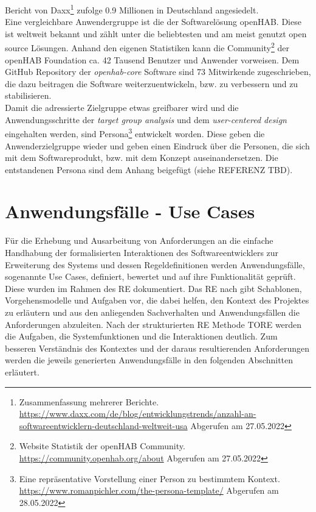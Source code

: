         Bericht von Daxx\footnote{Zusammenfassung mehrerer Berichte. \url{https://www.daxx.com/de/blog/entwicklungstrends/anzahl-an-softwareentwicklern-deutschland-weltweit-usa} Abgerufen am 27.05.2022}
        zufolge 0.9 Millionen in Deutschland angesiedelt. 
        \\
        \linebreak
        Eine vergleichbare Anwendergruppe ist die der Softwarelösung openHAB. Diese ist weltweit bekannt und zählt unter die 
        beliebtesten und am meist genutzt open source Lösungen. Anhand den eigenen Statistiken kann die Community\footnote{Website Statistik der openHAB Community. \url{https://community.openhab.org/about} Abgerufen am 27.05.2022} 
        der openHAB Foundation ca. 42 Tausend Benutzer und Anwender vorweisen. Dem GitHub Repository der \textit{openhab-core} 
        Software sind 73 Mitwirkende zugeschrieben, die dazu beitragen die Software weiterzuentwickeln, bzw. zu verbessern und zu 
        stabilisieren.
    \\
    \linebreak 
    Damit die adressierte Zielgruppe etwas greifbarer wird und die Anwendungsschritte der \textit{target group analysis} und 
    dem \textit{user-centered design} eingehalten werden, sind Persona\footnote{Eine repräsentative Vorstellung einer Person zu bestimmtem Kontext. \url{https://www.romanpichler.com/the-persona-template/} Abgerufen am 28.05.2022} 
    entwickelt worden. Diese geben die Anwenderzielgruppe wieder und geben einen Eindruck über die Personen, die sich mit dem 
    Softwareprodukt, bzw. mit dem Konzept auseinandersetzen. Die entstandenen Persona sind dem Anhang beigefügt 
    (siehe REFERENZ TBD). %

\section{Anwendungsfälle - Use Cases}
\label{sec:usecases}
    Für die Erhebung und Ausarbeitung von Anforderungen an die einfache Handhabung der formalisierten 
    Interaktionen des Softwareentwicklers zur Erweiterung des Systems und dessen Regeldefinitionen werden Anwendungsfälle, 
    sogenannte Use Cases, definiert, bewertet und auf ihre Funktionalität geprüft. Diese wurden im Rahmen 
    des \acl{RE} dokumentiert. Das \acs{RE} nach \cite{pohl2021basiswissen} gibt Schablonen, Vorgehensmodelle und Aufgaben 
    vor, die dabei helfen, den Kontext des Projektes zu erläutern und aus den anliegenden Sachverhalten und Anwendungsfällen 
    die Anforderungen abzuleiten. Nach der strukturierten \acs{RE} Methode \ac{TORE} \cite{tore2014} werden die 
    Aufgaben, die Systemfunktionen und die Interaktionen deutlich. Zum besseren Verständnis des Kontextes und der daraus 
    resultierenden Anforderungen werden die jeweils generierten Anwendungsfälle in den folgenden Abschnitten 
    erläutert.
    \\
    \linebreak
